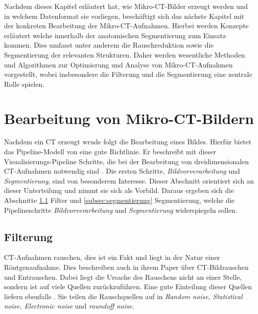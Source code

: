Nachdem dieses Kapitel erläutert hat, wie Mikro-\ac{CT}-Bilder erzeugt werden
und in welchem Datenformat sie vorliegen, beschäftigt sich das nächste Kapitel mit
der konkreten Bearbeitung der Mikro-\ac{CT}-Aufnahmen. Hierbei werden Konzepte erläutert
welche innerhalb der anatomischen Segmentierung zum Einsatz kommen. Dies umfasst
unter anderem die Rauschreduktion sowie die Segmentierung der relevanten
Strukturen. Daher werden wesentliche Methoden und Algorithmen zur Optimierung und
Analyse von Mikro-\ac{CT}-Aufnahmen vorgestellt, wobei insbesondere die Filterung
und die Segmentierung eine zentrale Rolle spielen.

\pagebreak

\section{Bearbeitung von Mikro-CT-Bildern}
\label{sec:bildbearbeitung} Nachdem ein \ac{CT} erzeugt wrude folgt die Bearbeitung
eines Bildes. Hierfür bietet das Pipeline-Modell von \citet[S.~50]{handels2000} eine
gute Richtlinie. Er beschreibt mit dieser Visualisierungs-Pipeline Schritte, die
bei der Bearbeitung von dreidimensionalen \ac{CT}-Aufnahmen notwendig sind
\citep[vgl.][S.~50]{handels2000}. Die ersten Schritte, \textit{Bildvorverarbeitung}
und \textit{Segmentierung}, sind von besonderem Interesse. Dieser Abschnitt orientiert
sich an dieser Unterteilung und nimmt sie sich als Vorbild. Daraus ergeben sich
die Abschnitte \ref{subsec:filter} Filter und \ref{subsec:segmentierung}
Segmentierung, welche die Pipelineschritte \textit{Bildvorverarbeitung} und
\textit{Segmentierung} widerspiegeln sollen.

\subsection{Filterung}
\label{subsec:filter} \ac{CT}-Aufnahmen rauschen, dies ist ein Fakt und liegt in
der Natur einer Röntgenaufnahme. Dies beschreiben auch \citet[K.~3]{diwakar2018}
in ihrem Paper über \ac{CT}-Bildrauschen und Entrauschen. Dabei liegt die Ursache
des Rauschens nicht an einer Stelle, sondern ist auf viele Quellen
zurückzuführen. Eine gute Einteilung dieser Quellen liefern ebenfalls \citet[K.~3]{diwakar2018}.
Sie teilen die Rauschquellen auf in \textit{Random noise, Statistical noise,
Electronic noise} und \textit{roundoff noise}.


